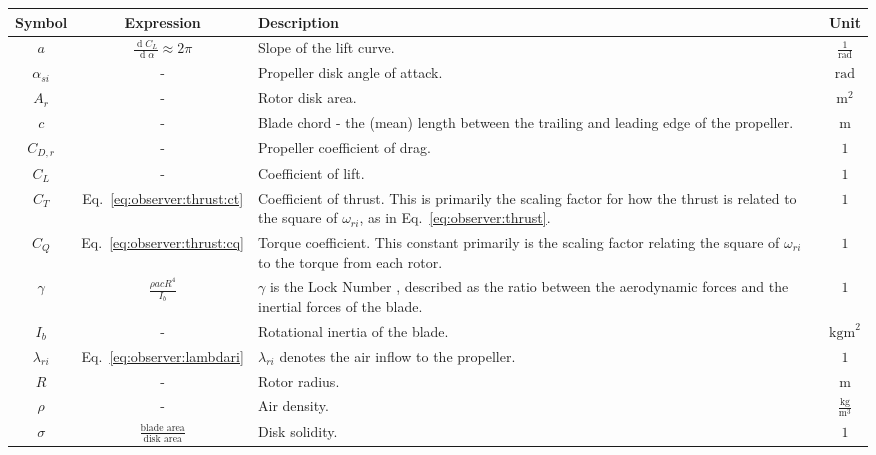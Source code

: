     \begin{table}
        \begin{tabularx}{\tablewidth}{|c|c|X|c|}\hline
            \textbf{Symbol} & \textbf{Expression} & \textbf{Description}  & \textbf{Unit} \\\hline
            $a$ & $\frac{\operatorname{d}\!C_{L}}{\operatorname{d}\!\alpha} \approx 2\pi$ & Slope of the lift curve. & $\frac{1}{\text{rad}}$ \\\hline
            $\alpha_{si}$ & - & Propeller disk angle of attack. & $\text{rad}$ \\\hline
            $A_{r}$ & - & Rotor disk area.   & $\text{m}^{2}$\\\hline
            $c$ & - & Blade chord - the (mean) length between the trailing and leading edge of the propeller.   & $\text{m}$ \\\hline
            $C_{D,r}$ & - & Propeller coefficient of drag. & $1$ \\\hline
            $C_{L}$ & - & Coefficient of lift. & $1$ \\\hline
            $C_{T}$ & Eq.~\ref{eq:observer:thrust:ct} & Coefficient of thrust. This is primarily the scaling factor for how the thrust is related to the square of $\omega_{ri}$, as in Eq.~\eqref{eq:observer:thrust}. & $1$\\\hline
            $C_{Q}$ & Eq.~\ref{eq:observer:thrust:cq} & Torque coefficient. This constant primarily is the scaling factor relating the square of $\omega_{ri}$ to the torque from each rotor. & $1$\\\hline
            $\gamma$ & $\frac{\rho a c R^{4}}{I_{b}}$ & $\gamma$ is the Lock Number \citep{leishman2002principles}, described as the ratio between the aerodynamic forces and the inertial forces of the blade.   & $1$ \\ \hline
            $I_{b}$ & - & Rotational inertia of the blade.  & $\text{kgm}^{2}$\\\hline
            $\lambda_{ri}$ & Eq.~\eqref{eq:observer:lambdari} & $\lambda_{ri}$ denotes the air inflow to the propeller. & $1$ \\\hline
            $R$ & - & Rotor radius.   & $\text{m}$ \\\hline
            $\rho$ & - & Air density.   & $\frac{\text{kg}}{\text{m}^{3}}$ \\\hline
            $\sigma$ & $\frac{\text{blade area}}{\text{disk area}}$ & Disk solidity. & $1$ \\\hline

\end{tabularx}
\end{table}
